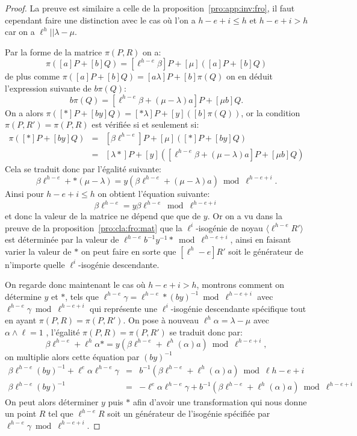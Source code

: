 \documentclass[10pt,a4paper]{book}
\theoremstyle{plain}
\theoremstyle{definition}
\theoremstyle{definition}
\theoremstyle{definition}
\theoremstyle{definition}
\theoremstyle{remark}
\theoremstyle{remark}
\theoremstyle{definition}
\begin{document}
\begin{proof}
La preuve est similaire a celle de la proposition~\ref{pro:app:inv:fro}, il 
faut cependant faire une distinction avec le cas où l'on a $h-e+i \leqslant h$ 
et $h-e+i > h$ car on a $\ell^h || \lambda - \mu$.

Par la forme de la matrice $\pi(P,R)$ on a:
\[ \pi([a]P+[b]Q)=[\ell^{h-e} \beta] P + [\mu] ([a]P+[b]Q)\]
de plus comme $\pi([a]P+[b]Q)=[a \lambda ]P + [b] \pi(Q)$ on en déduit 
l'expression suivante de $b\pi(Q)$:
\[ b \pi(Q)=[\ell^{h-e}\beta + (\mu - \lambda)a]P + [\mu b] Q. \]
On a alors $\pi([*]P+[by]Q)=[*\lambda]P+[y]([b]\pi(Q))$, or la condition 
$\pi(P,R')=\pi(P,R)$ est vérifiée si et seulement si:
\begin{eqnarray*}
\pi([*]P+[by]Q) &=& [\beta \ell^{h-e}] P + [\mu]([*]P+[by]Q) \\
				&=& [\lambda *]P + [y]([\ell^{h-e}\beta + (\mu - \lambda)a]P + [\mu b] Q)
\end{eqnarray*}
Cela se traduit donc par l'égalité suivante:
\[ \beta \ell^{h-e} + *(\mu-\lambda)=y(\beta \ell^{h-e}+(\mu - \lambda )a) \bmod \ell^{h-e+i}. \]
Ainsi pour $h-e+i \leqslant h$ on obtient l'équation suivante:
\[\beta \ell^{h-e} = y\beta \ell^{h-e}  \bmod \ell^{h-e+i} \]
et donc la valeur de la matrice ne dépend que que de $y$. Or on a vu dans la
preuve de la proposition~\ref{pro:cla:fro:mat} que la
$\ell^i$-isogénie de noyau $\langle \ell^{h-e}R' \rangle$ est déterminée par la 
valeur de $\ell^{h-e}b^{-1}y^{-1}* \bmod \ell^{h-e+i}$, ainsi en faisant 
varier la valeur de $*$ on peut faire en sorte que $[\ell^h-e]R'$ soit le 
générateur de n'importe quelle $\ell^{i}$-isogénie descendante.

On regarde donc maintenant le cas où $h-e+i>h$, montrons comment on détermine
$y$ et $*$,  tels que $\ell^{h-e}\gamma=\ell^{h-e}*(by)^{-1} \bmod 
\ell^{h-e+i}$ avec $\ell^{h-e}\gamma \bmod \ell^{h-e+i}$ qui représente une 
$\ell^i$-isogénie descendante spécifique tout en ayant $\pi(P,R)=\pi(P,R')$.
On pose à nouveau $\ell^{h} \alpha = \lambda - \mu$ avec $\alpha \wedge \ell=1$
, l'égalité $\pi(P,R)=\pi(P,R')$ se traduit donc par:
\[ \beta \ell^{h-e} + \ell^{h}\alpha *=y(\beta \ell^{h-e}+\ell^{h}(\alpha)a) \bmod \ell^{h-e+i}, \]
on multiplie alors cette équation par $(by)^{-1}$
\begin{eqnarray*}
\beta \ell^{h-e}(by)^{-1} + \ell^{e}\alpha \ell^{h-e} \gamma &=& b^{-1}(\beta \ell^{h-e}+\ell^{h}(\alpha)a) \bmod \ell{h-e+i} \\
\beta \ell^{h-e}(by)^{-1} &=& - \ell^{e}\alpha \ell^{h-e} \gamma + b^{-1}(\beta \ell^{h-e}+\ell^{h}(\alpha)a) \bmod \ell^{h-e+i}
\end{eqnarray*}
On peut alors déterminer $y$ puis $*$ afin d'avoir une transformation qui nous 
donne un point $R$ tel que $\ell^{h-e}R$ soit un générateur de l'isogénie 
spécifiée par $\ell^{h-e}\gamma \bmod \ell^{h-e+i}$.
\end{proof}
\end{document}
